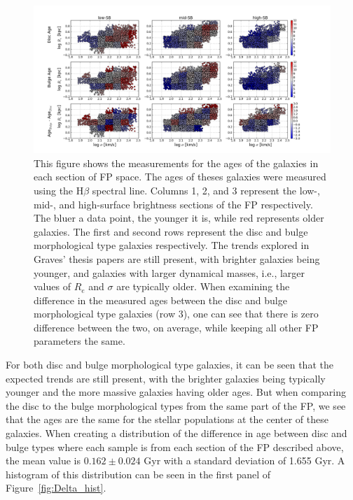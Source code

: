 \documentclass[showcase, preprintnumbers, amsmath, amssymb, bibnotes, 12pt]{revtex4}
\begin{document}
\begin{figure}
\begin{center}
\includegraphics[scale=0.43]{Age_map_9panel.png}
\end{center}
\caption{This figure shows the measurements for the ages of the galaxies in each section of FP space. The ages of theses galaxies were measured using the H$\beta$ spectral line. Columns 1, 2, and 3 represent the low-, mid-, and high-surface brightness sections of the FP respectively. The bluer a data point, the younger it is, while red represents older galaxies. The first and second rows represent the disc and bulge morphological type galaxies respectively. The trends explored in Graves' thesis papers are still present, with brighter galaxies being younger, and galaxies with larger dynamical masses, i.e., larger values of $R_e$ and $\sigma$ are typically older. When examining the difference in the measured ages between the disc and bulge morphological type galaxies (row 3), one can see that there is zero difference between the two, on average, while keeping all other FP parameters the same. \label{fig:age_maps}}
\end{figure}

For both disc and bulge morphological type galaxies, it can be seen that the expected trends are still present, with the brighter galaxies being typically younger and the more massive galaxies having older ages. But when comparing the disc to the bulge morphological types from the same part of the FP, we see that the ages are the same for the stellar populations at the center of these galaxies. When creating a distribution of the difference in age between disc and bulge types where each sample is from each section of the FP described above, the mean value is $0.162\pm0.024$ Gyr with a standard deviation of 1.655 Gyr. A histogram of this distribution can be seen in the first panel of Figure~\ref{fig:Delta_hist}.
\end{document}
